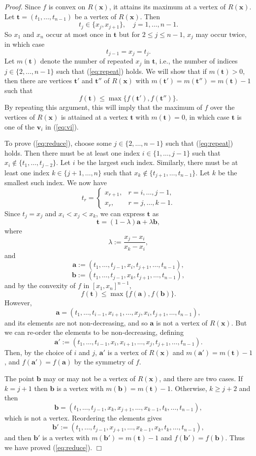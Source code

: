 \documentclass[12pt]{article}
\def\bfa{\mathbf{a}}
\def\bfb{\mathbf{b}}
\def\bft{\mathbf{t}}
\def\bfv{\mathbf{v}}
\def\bfx{\mathbf{x}}
\newenvironment{proof}{\begin{trivlist}\item[]{\emph{Proof.}}}
               {\hfill$\Box$\end{trivlist}}
\begin{document}
\begin{proof}
Since $f$ is convex on $R(\bfx)$, it attains its maximum at a vertex
of $R(\bfx)$.
Let $\bft = (t_1,\ldots,t_{n-1})$ be a vertex of $R(\bfx)$. Then
$$ t_j \in \{x_j,x_{j+1}\}, \quad j=1,\ldots,n-1. $$
So $x_1$ and $x_n$ occur at most once in $\bft$
but for $2 \le j \le n-1$, $x_j$
may occur twice, in which case
\begin{equation}\label{eq:repeat}
t_{j-1} = x_j = t_j.
\end{equation}
Let $m(\bft)$ denote the number of repeated $x_j$ in $\bft$,
i.e., the number of indices $j \in \{2,\ldots,n-1\}$
such that (\ref{eq:repeat}) holds.
We will show that if $m(\bft) > 0$, then there are vertices
$\bft'$ and $\bft''$ of $R(\bfx)$
with $m(\bft') = m(\bft'') = m(\bft) - 1$
such that
\begin{equation}\label{eq:reduce}
f(\bft) \le \max\{f(\bft'),f(\bft'')\}.
\end{equation}
By repeating this argument, this will imply
that the maximum of $f$ over the vertices of $R(\bfx)$
is attained at a vertex $\bft$ with $m(\bft) = 0$,
in which case $\bft$ is one of the $\bfv_i$ in (\ref{eq:vi}).

To prove (\ref{eq:reduce}),
choose some $j \in \{2,\ldots,n-1\}$ such that
(\ref{eq:repeat}) holds.
Then there must be at least one index
$i \in \{1,\ldots,j-1\}$ such that
$x_i \notin \{t_1,\ldots,t_{j-2}\}$.
Let $i$ be the largest such index.
Similarly, there must be at least one index
$k \in \{j+1,\ldots,n\}$ such that
$x_k \notin \{t_{j+1},\ldots,t_{n-1}\}$.
Let $k$ be the smallest such index.
We now have
$$
t_r = \begin{cases}
	x_{r+1}, & r=i,\ldots,j-1, \\
	x_r, & r=j,\ldots,k-1.
\end{cases}
$$
Since $t_j = x_j$ and $x_i < x_j < x_k$, we can
express $\bft$ as
$$ \bft = (1-\lambda) \bfa + \lambda \bfb, $$
where
$$ \lambda := \frac{x_j-x_i}{x_k-x_i}, $$
and
$$ \bfa := (t_1,\ldots,t_{j-1},x_i,t_{j+1},\ldots,t_{n-1}), $$
$$ \bfb := (t_1,\ldots,t_{j-1},x_k,t_{j+1},\ldots,t_{n-1}), $$
and by the convexity of $f$ in $[x_1,x_n]^{n-1}$,
$$ f(\bft) \le \max\{f(\bfa),f(\bfb)\}. $$
However,
$$ \bfa =
 (t_1,\ldots,t_{i-1},x_{i+1},\ldots,x_j,x_i,t_{j+1},\ldots,t_{n-1}), $$
and its elements are not non-decreasing, and so
$\bfa$ is not a vertex of $R(\bfx)$. But
we can re-order the elements to be non-decreasing, defining
$$ \bfa' := (t_1,\ldots,t_{i-1},
x_i,x_{i+1},\ldots,x_j,t_{j+1},\ldots,t_{n-1}). $$
Then, by the choice of $i$ and $j$, $\bfa'$ is a vertex of $R(\bfx)$
and $m(\bfa') = m(\bft)-1$, and
$f(\bfa') = f(\bfa)$ by the symmetry of $f$.

The point $\bfb$ may or may not be a vertex of $R(\bfx)$,
and there are two cases.
If $k=j+1$ then $\bfb$ is a vertex with $m(\bfb) = m(\bft) - 1$.
Otherwise, $k\ge j+2$ and then
$$ \bfb =
(t_1,\ldots,t_{j-1},x_k,x_{j+1},\ldots,x_{k-1},t_k,\ldots,t_{n-1}), $$
which is not a vertex.
Reordering the elements gives
$$ \bfb' := (t_1,\ldots,t_{j-1},
x_{j+1},\ldots,x_{k-1},x_k,t_k,\ldots,t_{n-1}), $$
and then $\bfb'$ is a vertex with $m(\bfb') = m(\bft)-1$
and $f(\bfb') = f(\bfb)$.
Thus we have proved (\ref{eq:reduce}).
\end{proof}
\end{document}
